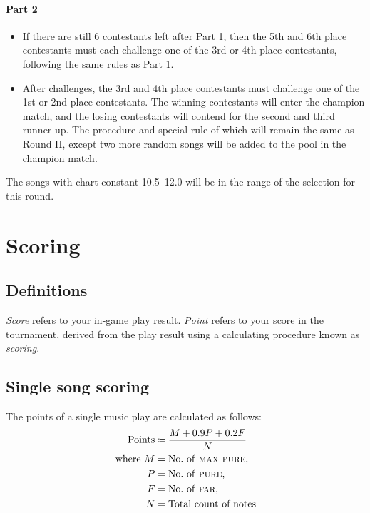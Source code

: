 \documentclass{article}
\newcommand{\alert}[1]{{\color{red} #1}}
\newcommand{\scoreformula}[1]{{\color{red} #1}}
\newcommand{\srbgcolor}{red!40}
\begin{document}
\paragraph{Part 2}

\begin{itemize}
	\item If there are still 6 contestants left after Part 1,
	      then the 5th and 6th place contestants must each challenge
	      one of the 3rd or 4th place contestants,
	      following the same rules as Part 1.

	\item After challenges, the 3rd and 4th place contestants
	      must challenge one of the 1st or 2nd place contestants.
	      The winning contestants will enter the champion match,
	      and the losing contestants will contend for the
	      second and third runner-up.
	      The procedure and \colorbox{\srbgcolor}{special rule} of which
	      will remain the same as Round II,
	      except two more random songs will be added
	      to the pool in the champion match.
\end{itemize}

\alert{
	The songs with chart constant 10.5--12.0
	will be in the range of the selection for this round.
}

\section{Scoring}

\subsection{Definitions}
\emph{Score} refers to your in-game play result.
\emph{Point} refers to your score in the tournament,
derived from the play result
using a calculating procedure known as \emph{scoring}.

\newcommand{\notestyle}[1]{\textsc{\lowercase {#1}}}
\newcommand\Points{\text{Points}}
\newcommand\MaxPure{\notestyle{Max Pure}}
\newcommand\Pure{\notestyle{Pure}}
\newcommand\Far{\notestyle{Far}}
\newcommand\Lost{\notestyle{Lost}}
\newcommand{\coloneq}{\mathrel{\resizebox{\widthof{$\mathord{=}$}}{\height}{ $\!\!\resizebox{1.2\width}{0.8\height}{\raisebox{0.23ex}{$\mathop{:}$}}\!\!=\!\!$ }}}

\subsection{Single song scoring}
The points of a single music play are calculated as follows:
\scoreformula{
	\begin{align*}
		\Points        & \coloneq \frac{M + 0.9P + 0.2F}{N} \\
		\text{where}~M & = \text{No.~of \MaxPure,}          \\
		P              & = \text{No.~of \Pure,}             \\
		F              & = \text{No.~of \Far,}              \\
		N              & = \text{Total count of notes}
	\end{align*}
}
\end{document}
